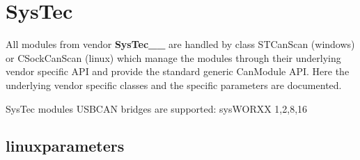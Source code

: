 \documentclass[a4paper,10pt,english]{sphinxmanual}
\begin{document}
\chapter{SysTec}
\label{\detokenize{vendors/systec:systec}}\label{\detokenize{vendors/systec::doc}}
\sphinxAtStartPar
All modules from vendor {\color{red}\bfseries{}\textasciigrave{}SysTec\textasciigrave{}\_\_} are handled by class STCanScan (windows) or CSockCanScan (linux) which
manage the modules through their underlying vendor specific API and provide the standard generic CanModule API.
Here the underlying vendor specific classes and the specific parameters are documented.

\sphinxAtStartPar
SysTec modules USB\sphinxhyphen{}CAN bridges are supported: sysWORXX 1,2,8,16


\section{linux\sphinxhyphen{}parameters}
\label{\detokenize{vendors/systec:linux-parameters}}
\end{document}

